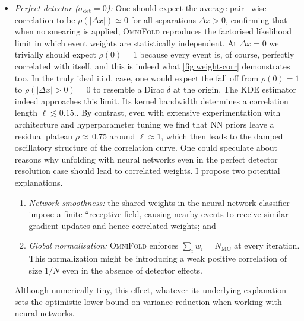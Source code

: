             \begin{itemize}
            \item \emph{Perfect detector ($\sigma_{\det}=0$):}
                One should expect the average pair-–wise correlation to be $\rho(|\Delta x|)\!\simeq\!0$ for all separations $\Delta x>0$, confirming that when no smearing is applied, \textsc{OmniFold} reproduces the {factorised likelihood} limit in which event weights are statistically independent.
                At $\Delta x = 0$ we trivially should expect $\rho(0)=1$ because every event is, of course, perfectly correlated with itself, and this is indeed what \cref{fig:weight-corr} demonstrates too.
                In the truly ideal i.i.d. case, one would expect the fall off from $\rho(0)=1$ to $\rho(|\Delta  x|>0)\!=\!0$ to resemble a Dirac $\delta$ at the origin.
                The {KDE} estimator indeed approaches this limit.
                Its kernel bandwidth determines a correlation length \(\ell \lesssim\!0.15\)..
                By contrast, even with extensive experimentation with architecture and hyperparameter tuning we find that {NN} priors leave a residual plateau $\rho\!\approx\!$\,$0.75$ around $\ell\!\approx\!1$, which then leads to the damped oscillatory structure of the correlation curve.
                One could speculate about reasons why unfolding with neural networks even in the perfect detector resolution case should lead to correlated weights.
                I propose two potential explanations.
                \begin{enumerate}
                    \item \emph{Network smoothness:} the shared weights in the neural network classifier impose a finite ``receptive field,  causing nearby events to receive similar gradient updates and hence correlated weights; and
                    \item \emph{Global normalisation:} \textsc{OmniFold} enforces $\sum_i w_i = N_{\text{MC}}$ at every iteration.
                    This normalization might be introducing a weak positive correlation of size $1/N$ even in the absence of detector effects. 
                \end{enumerate}
                Although numerically tiny, this effect, whatever its underlying explanation sets the optimistic lower bound on variance reduction when working with neural networks.

\end{itemize}
